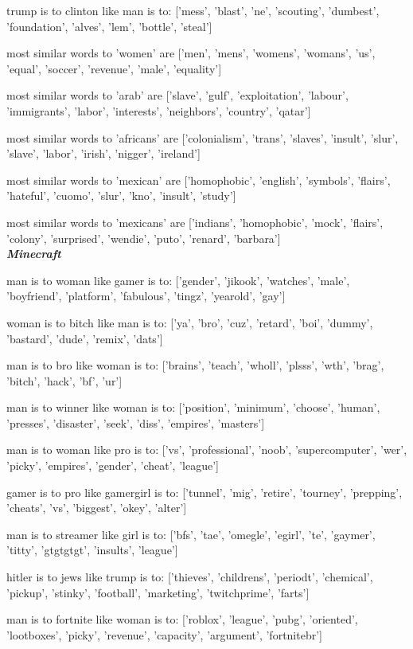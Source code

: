 trump is to clinton like man is to: ['mess', 'blast', 'ne', 'scouting', 'dumbest', 'foundation', 'alves', 'lem', 'bottle', 'steal']

most similar words to 'women' are ['men', 'mens', 'womens', 'womans', 'us', 'equal', 'soccer', 'revenue', 'male', 'equality']

most similar words to 'arab' are ['slave', 'gulf', 'exploitation', 'labour', 'immigrants', 'labor', 'interests', 'neighbors', 'country', 'qatar']

most similar words to 'africans' are ['colonialism', 'trans', 'slaves', 'insult', 'slur', 'slave', 'labor', 'irish', 'nigger', 'ireland']

most similar words to 'mexican' are ['homophobic', 'english', 'symbols', 'flairs', 'hateful', 'cuomo', 'slur', 'kno', 'insult', 'study']

most similar words to 'mexicans' are ['indians', 'homophobic', 'mock', 'flairs', 'colony', 'surprised', 'wendie', 'puto', 'renard', 'barbara']
\\


\textbf{\emph{Minecraft}}

man is to woman like gamer is to: ['gender', 'jikook', 'watches', 'male', 'boyfriend', 'platform', 'fabulous', 'tingz', 'yearold', 'gay']

woman is to bitch like man is to: ['ya', 'bro', 'cuz', 'retard', 'boi', 'dummy', 'bastard', 'dude', 'remix', 'dats']

man is to bro like woman is to: ['brains', 'teach', 'wholl', 'plsss', 'wth', 'brag', 'bitch', 'hack', 'bf', 'ur']

man is to winner like woman is to: ['position', 'minimum', 'choose', 'human', 'presses', 'disaster', 'seek', 'diss', 'empires', 'masters']

man is to woman like pro is to: ['vs', 'professional', 'noob', 'supercomputer', 'wer', 'picky', 'empires', 'gender', 'cheat', 'league']

gamer is to pro like gamergirl is to: ['tunnel', 'mig', 'retire', 'tourney', 'prepping', 'cheats', 'vs', 'biggest', 'okey', 'alter']

man is to streamer like girl is to: ['bfs', 'tae', 'omegle', 'egirl', 'te', 'gaymer', 'titty', 'gtgtgtgt', 'insults', 'league']

hitler is to jews like trump is to: ['thieves', 'childrens', 'periodt', 'chemical', 'pickup', 'stinky', 'football', 'marketing', 'twitchprime', 'farts']

man is to fortnite like woman is to: ['roblox', 'league', 'pubg', 'oriented', 'lootboxes', 'picky', 'revenue', 'capacity', 'argument', 'fortnitebr']

